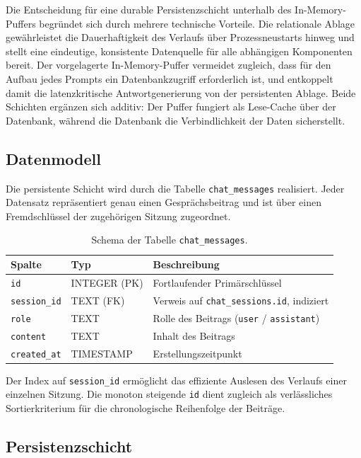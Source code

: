 \documentclass[11pt,a4paper]{article}
\begin{document}
Die Entscheidung für eine durable Persistenzschicht unterhalb des In-Memory-Puffers
begründet sich durch mehrere technische Vorteile. Die relationale Ablage gewährleistet
die Dauerhaftigkeit des Verlaufs über Prozessneustarts hinweg und stellt eine eindeutige,
konsistente Datenquelle für alle abhängigen Komponenten bereit. Der vorgelagerte
In-Memory-Puffer vermeidet zugleich, dass für den Aufbau jedes Prompts ein
Datenbankzugriff erforderlich ist, und entkoppelt damit die latenzkritische
Antwortgenerierung von der persistenten Ablage. Beide Schichten ergänzen sich additiv:
Der Puffer fungiert als Lese-Cache über der Datenbank, während die Datenbank die
Verbindlichkeit der Daten sicherstellt.

\subsection{Datenmodell}

Die persistente Schicht wird durch die Tabelle \texttt{chat\_messages} realisiert.
Jeder Datensatz repräsentiert genau einen Gesprächsbeitrag und ist über einen
Fremdschlüssel der zugehörigen Sitzung zugeordnet.

\begin{table}[h]
\centering
\begin{tabular}{lll}
\hline
\textbf{Spalte} & \textbf{Typ} & \textbf{Beschreibung} \\
\hline
\texttt{id}          & INTEGER (PK) & Fortlaufender Primärschlüssel \\
\texttt{session\_id} & TEXT (FK)    & Verweis auf \texttt{chat\_sessions.id}, indiziert \\
\texttt{role}        & TEXT         & Rolle des Beitrags (\texttt{user} / \texttt{assistant}) \\
\texttt{content}     & TEXT         & Inhalt des Beitrags \\
\texttt{created\_at} & TIMESTAMP    & Erstellungszeitpunkt \\
\hline
\end{tabular}
\caption{Schema der Tabelle \texttt{chat\_messages}.}
\end{table}

Der Index auf \texttt{session\_id} ermöglicht das effiziente Auslesen des Verlaufs
einer einzelnen Sitzung. Die monoton steigende \texttt{id} dient zugleich als
verlässliches Sortierkriterium für die chronologische Reihenfolge der Beiträge.

\subsection{Persistenzschicht}
\end{document}
